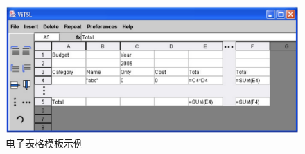 \begin{figure}[tp]    
    \centering
    \includegraphics[width=1\textwidth]{figure/relatedwork/template.png}
    \caption{电子表格模板示例}
    \label{figure-template}
\end{figure}